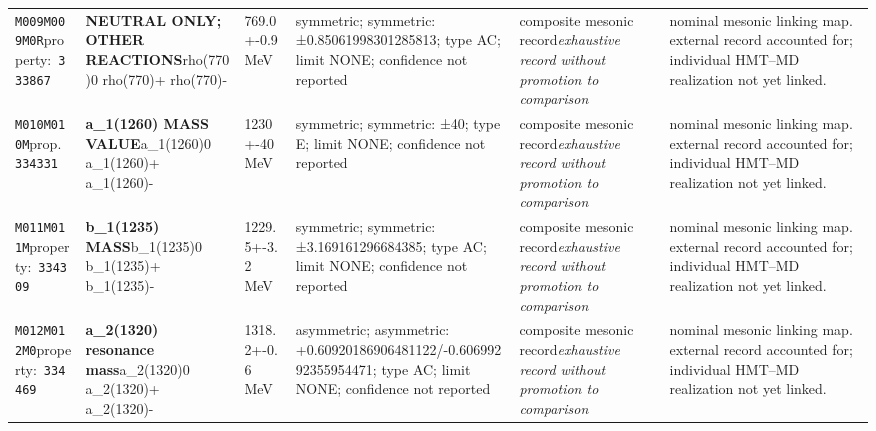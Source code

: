 \begin{landscape}
\begin{longtable}{L{1.85cm}L{4.45cm}L{2.35cm}L{4.05cm}L{3.35cm}L{7.15cm}}
\texttt{M009}\newline \texttt{M009M0R}\newline property:\ \texttt{333867} & \textbf{NEUTRAL ONLY; OTHER REACTIONS}\newline rho(770)0 \textbar{}\allowbreak{} rho(770)+ \textbar{}\allowbreak{} rho(770)- & 769.0+-0.9\,MeV & symmetric; symmetric: ±0.85061998301285813; type AC; limit NONE; confidence not reported & composite mesonic record\newline \emph{exhaustive record without promotion to comparison} & nominal mesonic linking map. external record accounted for; individual HMT--MD realization not yet linked. \\
\texttt{M010}\newline \texttt{M010M}\newline prop.\ \texttt{334331} & \textbf{a\_\allowbreak{}1(1260) MASS VALUE}\newline a\_\allowbreak{}1(1260)0 \textbar{}\allowbreak{} a\_\allowbreak{}1(1260)+ \textbar{}\allowbreak{} a\_\allowbreak{}1(1260)- & 1230+-40\,MeV & symmetric; symmetric: ±40; type E; limit NONE; confidence not reported & composite mesonic record\newline \emph{exhaustive record without promotion to comparison} & nominal mesonic linking map. external record accounted for; individual HMT--MD realization not yet linked. \\
\texttt{M011}\newline \texttt{M011M}\newline property:\ \texttt{334309} & \textbf{b\_\allowbreak{}1(1235) MASS}\newline b\_\allowbreak{}1(1235)0 \textbar{}\allowbreak{} b\_\allowbreak{}1(1235)+ \textbar{}\allowbreak{} b\_\allowbreak{}1(1235)- & 1229.5+-3.2\,MeV & symmetric; symmetric: ±3.169161296684385; type AC; limit NONE; confidence not reported & composite mesonic record\newline \emph{exhaustive record without promotion to comparison} & nominal mesonic linking map. external record accounted for; individual HMT--MD realization not yet linked. \\
\texttt{M012}\newline \texttt{M012M0}\newline property:\ \texttt{334469} & \textbf{a\_\allowbreak{}2(1320) resonance mass}\newline a\_\allowbreak{}2(1320)0 \textbar{}\allowbreak{} a\_\allowbreak{}2(1320)+ \textbar{}\allowbreak{} a\_\allowbreak{}2(1320)- & 1318.2+-0.6\,MeV & asymmetric; asymmetric: +0.60920186906481122/-0.60699292355954471; type AC; limit NONE; confidence not reported & composite mesonic record\newline \emph{exhaustive record without promotion to comparison} & nominal mesonic linking map. external record accounted for; individual HMT--MD realization not yet linked. \\

\end{longtable}
\end{landscape}
